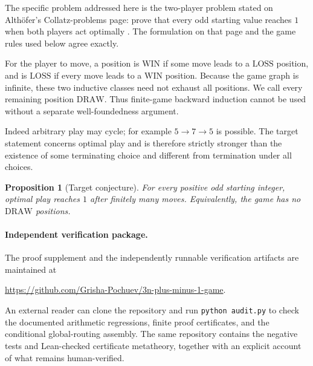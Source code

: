 \documentclass[11pt]{article}
\newtheorem{proposition}[theorem]{Proposition}
\newcommand{\WIN}{\mathrm{WIN}}
\newcommand{\LOSS}{\mathrm{LOSS}}
\newcommand{\DRAW}{\mathrm{DRAW}}
\begin{document}
The specific problem addressed here is the two-player problem stated on
Alth\"ofer's Collatz-problems page: prove that every odd starting value reaches
$1$ when both players act optimally \cite{AlthoferProblemPage}. The formulation
on that page and the game rules used below agree exactly.

For the player to move, a position is $\WIN$ if some move leads to a $\LOSS$
position, and is $\LOSS$ if every move leads to a $\WIN$ position. Because the
game graph is infinite, these two inductive classes need not exhaust all
positions. We call every remaining position $\DRAW$. Thus finite-game backward
induction cannot be used without a separate well-foundedness argument.

Indeed arbitrary play may cycle; for example $5\to7\to5$ is possible. The
target statement concerns optimal play and is therefore strictly stronger than the
existence of some terminating choice and different from termination under all
choices.

\begin{center}
\end{center}

\begin{proposition}[Target conjecture]\label{thm:main}
For every positive odd starting integer, optimal play reaches $1$ after
finitely many moves. Equivalently, the game has no $\DRAW$ positions.
\end{proposition}

\paragraph{Independent verification package.}
The proof supplement and the independently runnable verification
artifacts are maintained at
\begin{center}
\url{https://github.com/Grisha-Pochuev/3n-plus-minus-1-game}.
\end{center}
An external reader can clone the repository and run \texttt{python audit.py}
to check the documented arithmetic regressions, finite proof certificates,
and the conditional global-routing assembly. The same repository contains the
negative tests and Lean-checked certificate metatheory, together with an
explicit account of what remains human-verified.
\end{document}
